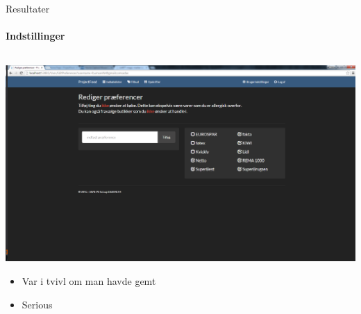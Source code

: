 \begin{frame}{Resultater}
\framesubtitle{Indstillinger}


	
	\begin{minipage}[0.3\textheight]{\textwidth}
	\begin{columns}[T]
	\begin{column}{1\textwidth}
	\vspace{-15 pt}
	 \includegraphics[width=1\textwidth,height=1\textheight,keepaspectratio, trim={1cm 0 0 16mm}, clip]{images/Screenshots/SettingsOld2.png}
	 
	 \begin{itemize}
	 	 	\item Var i tvivl om man havde gemt
	 	 	\item Serious
	 \end{itemize}
	
	\end{column}

	\end{columns}

  \end{minipage}
	
\end{frame}

